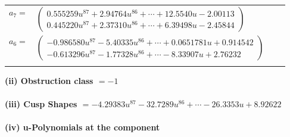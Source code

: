 \documentclass[1p]{elsarticle_modified}
\theoremstyle{definition}
\begin{document}
\begin{tabular}{m{7pt} m{180pt} m{7pt} m{180pt} }
\flushright $a_{7}=$&$\begin{pmatrix}0.555259 u^{87}+2.94764 u^{86}+\cdots+12.5540 u-2.00113\\0.445220 u^{87}+2.37310 u^{86}+\cdots+6.39498 u-2.45844\end{pmatrix}$ \\
\flushright $a_{6}=$&$\begin{pmatrix}-0.986580 u^{87}-5.40335 u^{86}+\cdots+0.0651781 u+0.914542\\-0.613296 u^{87}-1.77328 u^{86}+\cdots-8.33907 u+2.76232\end{pmatrix}$\\&\end{tabular}
\flushleft \textbf{(ii) Obstruction class $= -1$}\\~\\
\flushleft \textbf{(iii) Cusp Shapes $= -4.29383 u^{87}-32.7289 u^{86}+\cdots-26.3353 u+8.92622$}\\~\\
\newpage\renewcommand{\arraystretch}{1}
\flushleft \textbf{(iv) u-Polynomials at the component}\newline \\
\end{document}
